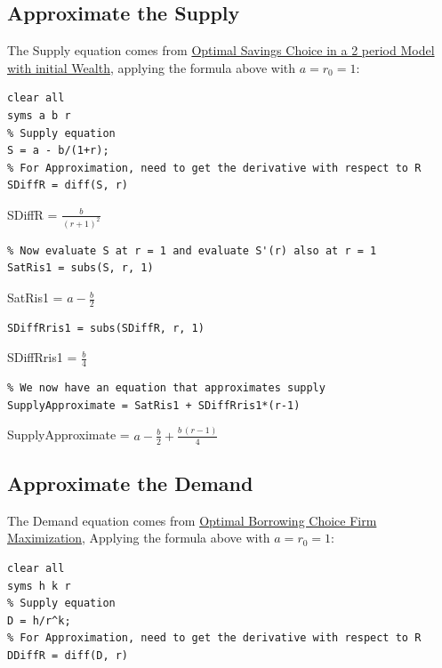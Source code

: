 \documentclass[
]{book}
\begin{document}
\hypertarget{approximate-the-supply}{%
\subsection{Approximate the Supply}\label{approximate-the-supply}}

The Supply equation comes from \href{https://fanwangecon.github.io/Math4Econ/derivative_application/K_save_households.html}{Optimal Savings Choice in a 2 period
Model with initial
Wealth},
applying the formula above with \(a=r_0 =1\):

\begin{verbatim}
clear all
syms a b r
% Supply equation
S = a - b/(1+r);
% For Approximation, need to get the derivative with respect to R
SDiffR = diff(S, r)
\end{verbatim}

SDiffR = \(\displaystyle \frac{b}{{{\left(r+1\right)}}^2 }\)

\begin{verbatim}
% Now evaluate S at r = 1 and evaluate S'(r) also at r = 1
SatRis1 = subs(S, r, 1)
\end{verbatim}

SatRis1 = \(\displaystyle a-\frac{b}{2}\)

\begin{verbatim}
SDiffRris1 = subs(SDiffR, r, 1)
\end{verbatim}

SDiffRris1 = \(\displaystyle \frac{b}{4}\)

\begin{verbatim}
% We now have an equation that approximates supply
SupplyApproximate = SatRis1 + SDiffRris1*(r-1)
\end{verbatim}

SupplyApproximate =
\(\displaystyle a-\frac{b}{2}+\frac{b\,{\left(r-1\right)}}{4}\)

\hypertarget{approximate-the-demand}{%
\subsection{Approximate the Demand}\label{approximate-the-demand}}

The Demand equation comes from \href{https://fanwangecon.github.io/Math4Econ/derivative_application/K_borrow_firm.html}{Optimal Borrowing Choice Firm
Maximization},
Applying the formula above with \(a=r_0 =1\):

\begin{verbatim}
clear all
syms h k r
% Supply equation
D = h/r^k;
% For Approximation, need to get the derivative with respect to R
DDiffR = diff(D, r)
\end{verbatim}
\end{document}
